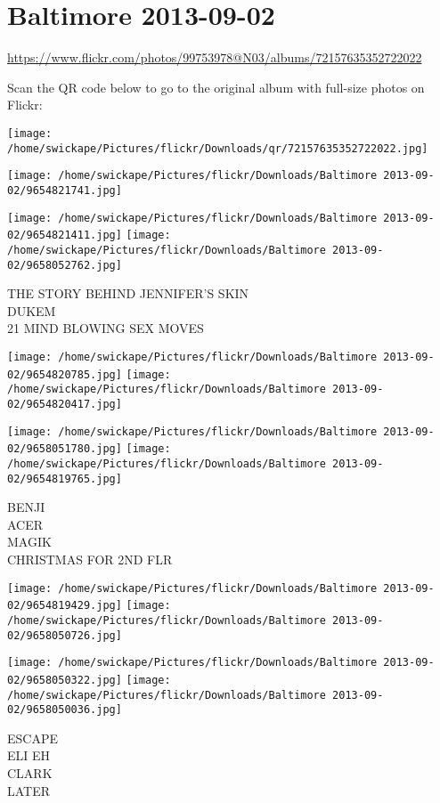 \documentclass[10pt,letterpaper]{article}
\title{}
\author{}
\date{}
\begin{document}
\section*{Baltimore 2013-09-02}

\url{https://www.flickr.com/photos/99753978@N03/albums/72157635352722022}

Scan the QR code below to go to the original album with full-size photos on Flickr:

\texttt{[image: /home/swickape/Pictures/flickr/Downloads/qr/72157635352722022.jpg]}
\pagebreak

\texttt{[image: /home/swickape/Pictures/flickr/Downloads/Baltimore 2013-09-02/9654821741.jpg]}

\vspace{0.25in}
\texttt{[image: /home/swickape/Pictures/flickr/Downloads/Baltimore 2013-09-02/9654821411.jpg]}
\texttt{[image: /home/swickape/Pictures/flickr/Downloads/Baltimore 2013-09-02/9658052762.jpg]}

THE STORY BEHIND JENNIFER'S SKIN\\
DUKEM\\
21 MIND BLOWING SEX MOVES
\pagebreak

\texttt{[image: /home/swickape/Pictures/flickr/Downloads/Baltimore 2013-09-02/9654820785.jpg]}
\texttt{[image: /home/swickape/Pictures/flickr/Downloads/Baltimore 2013-09-02/9654820417.jpg]}

\texttt{[image: /home/swickape/Pictures/flickr/Downloads/Baltimore 2013-09-02/9658051780.jpg]}
\texttt{[image: /home/swickape/Pictures/flickr/Downloads/Baltimore 2013-09-02/9654819765.jpg]}

BENJI\\
ACER\\
MAGIK\\
CHRISTMAS FOR 2ND FLR
\pagebreak

\texttt{[image: /home/swickape/Pictures/flickr/Downloads/Baltimore 2013-09-02/9654819429.jpg]}
\texttt{[image: /home/swickape/Pictures/flickr/Downloads/Baltimore 2013-09-02/9658050726.jpg]}

\texttt{[image: /home/swickape/Pictures/flickr/Downloads/Baltimore 2013-09-02/9658050322.jpg]}
\texttt{[image: /home/swickape/Pictures/flickr/Downloads/Baltimore 2013-09-02/9658050036.jpg]}

ESCAPE\\
ELI EH\\
CLARK\\
LATER
\pagebreak
\end{document}
